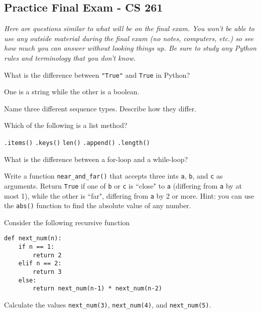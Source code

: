 \documentclass[12pt]{exam}
\begin{document}
\pagestyle{empty}
\graphicspath{{/home/brian/Dropbox/HSC/Spring16/Math111/}}

\subsection*{Practice Final Exam - CS 261}
\textit{Here are questions similar to what will be on the final exam.  You won't be able to use any outside material during the final exam (no notes, computers, etc.) so see how much you can answer without looking things up. Be sure to study any Python rules and terminology that you don't know. }

\begin{questions}

\question What is the difference between \verb|"True"| and \verb|True| in Python? 
\begin{solution}
One is a string while the other is a boolean. 
\end{solution}
\vfill

\question Name three different sequence types. Describe how they differ.
\vfill

\question Which of the following is a list method?
\begin{choices}
\choice \verb|.items()|
\choice \verb|.keys()|
\choice \verb|len()|
\CorrectChoice \verb|.append()|
\choice \verb|.length()|
\end{choices}
\smallskip

\question What is the difference between a for-loop and a while-loop?  
\vfill

\newpage
\question Write a function \verb|near_and_far()| that accepts three ints \verb|a|, \verb|b|, and \verb|c| as arguments. Return \verb|True| if one of \verb|b| or \verb|c| is ``close" to \verb|a| (differing from \verb|a| by at most 1), while the other is ``far", differing from \verb|a| by 2 or more. Hint: you can use the \verb|abs()| function to find the absolute value of any number.  
\vfill

\question Consider the following recursive function 

\begin{verbatim}
def next_num(n):
    if n == 1:
        return 2
    elif n == 2:
        return 3
    else:
        return next_num(n-1) * next_num(n-2)
\end{verbatim}

Calculate the values \verb`next_num(3)`, \verb`next_num(4)`, and \verb`next_num(5)`.  
\vfill

\newpage


\end{questions}
\end{document}
